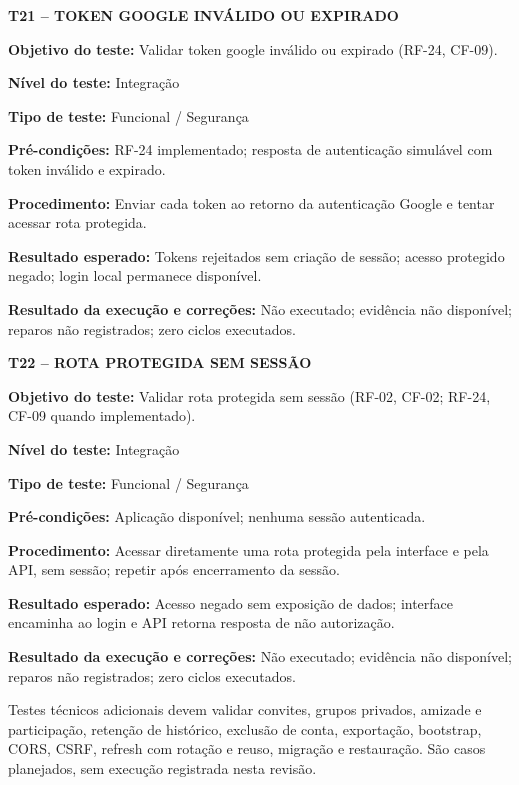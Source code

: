 \textbf{T21 -- TOKEN GOOGLE INVÁLIDO OU EXPIRADO}

\noindent\textbf{Objetivo do teste:} Validar token google inválido ou expirado (RF-24, CF-09).

\noindent\textbf{Nível do teste:} Integração

\noindent\textbf{Tipo de teste:} Funcional / Segurança

\noindent\textbf{Pré-condições:} RF-24 implementado; resposta de autenticação simulável com token inválido e expirado.

\noindent\textbf{Procedimento:} Enviar cada token ao retorno da autenticação Google e tentar acessar rota protegida.

\noindent\textbf{Resultado esperado:} Tokens rejeitados sem criação de sessão; acesso protegido negado; login local permanece disponível.

\noindent\textbf{Resultado da execução e correções:} Não executado; evidência não disponível; reparos não registrados; zero ciclos executados.

\textbf{T22 -- ROTA PROTEGIDA SEM SESSÃO}

\noindent\textbf{Objetivo do teste:} Validar rota protegida sem sessão (RF-02, CF-02; RF-24, CF-09 quando implementado).

\noindent\textbf{Nível do teste:} Integração

\noindent\textbf{Tipo de teste:} Funcional / Segurança

\noindent\textbf{Pré-condições:} Aplicação disponível; nenhuma sessão autenticada.

\noindent\textbf{Procedimento:} Acessar diretamente uma rota protegida pela interface e pela API, sem sessão; repetir após encerramento da sessão.

\noindent\textbf{Resultado esperado:} Acesso negado sem exposição de dados; interface encaminha ao login e API retorna resposta de não autorização.

\noindent\textbf{Resultado da execução e correções:} Não executado; evidência não disponível; reparos não registrados; zero ciclos executados.

Testes técnicos adicionais devem validar convites, grupos privados, amizade e participação, retenção de histórico, exclusão de conta, exportação, bootstrap, CORS, CSRF, refresh com rotação e reuso, migração e restauração. São casos planejados, sem execução registrada nesta revisão.
